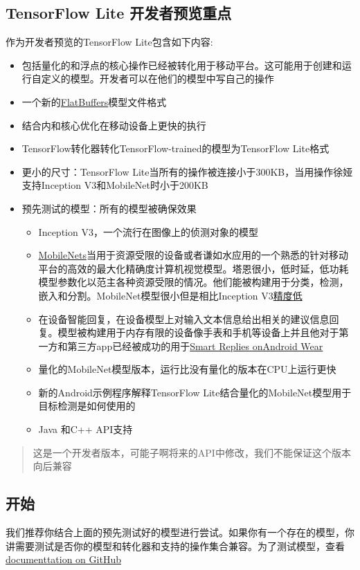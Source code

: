 \subsection{TensorFlow Lite 开发者预览重点}
作为开发者预览的TensorFlow Lite包含如下内容:
\begin{itemize}
\item 包括量化的和浮点的核心操作已经被转化用于移动平台。这可能用于创建和运行自定义的模型。开发者可以在他们的模型中写自己的操作
\item 一个新的\href{https://google.github.io/flatbuffers/}{FlatBuffers}模型文件格式
\item 结合内和核心优化在移动设备上更快的执行
\item TensorFlow转化器转化TensorFlow-trained的模型为TensorFlow Lite格式
\item 更小的尺寸：TensorFlow Lite当所有的操作被连接小于300KB，当用操作徐娅支持Inception V3和MobileNet时小于200KB
\item 预先测试的模型：所有的模型被确保效果\begin{itemize}
\item Inception V3，一个流行在图像上的侦测对象的模型
\item \href{https://github.com/tensorflow/models/blob/master/research/slim/nets/mobilenet_v1.md}{MobileNets}当用于资源受限的设备或者谦如水应用的一个熟悉的针对移动平台的高效的最大化精确度计算机视觉模型。塔恩很小，低时延，低功耗模型参数化以范主各种资源受限的情况。他们能被构建用于分类，检测，嵌入和分割。MobileNet模型很小但是相比Inception V3\href{https://research.googleblog.com/2017/06/mobilenets-open-source-models-for.html}{精度低}
\item 在设备智能回复，在设备模型上对输入文本信息给出相关的建议信息回复。模型被构建用于内存有限的设备像手表和手机等设备上并且他对于第一方和第三方app已经被成功的用于\href{https://research.googleblog.com/2017/02/on-device-machine-intelligence.html}{Smart Replies onAndroid Wear}
\item 量化的MobileNet模型版本，运行比没有量化的版本在CPU上运行更快
\item 新的Android示例程序解释TensorFlow Lite结合量化的MobileNet模型用于目标检测是如何使用的
\item Java 和C++ API支持
\end{itemize}
\end{itemize}
\begin{quote}
这是一个开发者版本，可能子啊将来的API中修改，我们不能保证这个版本向后兼容
\end{quote}
\subsection{开始}
我们推荐你结合上面的预先测试好的模型进行尝试。如果你有一个存在的模型，你讲需要测试是否你的模型和转化器和支持的操作集合兼容。为了测试模型，查看\href{https://github.com/tensorflow/tensorflow/tree/master/tensorflow/contrib/lite}{documenttation on GitHub}
